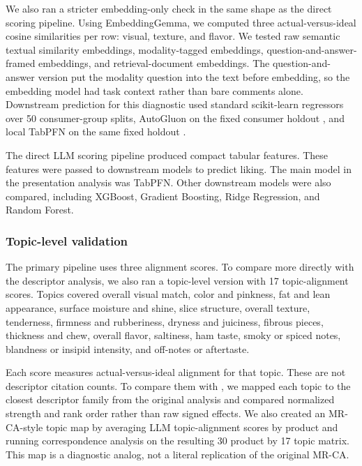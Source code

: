 \documentclass[12pt]{article}
\begin{document}
We also ran a stricter embedding-only check in the same shape as the direct scoring pipeline. Using EmbeddingGemma, we computed three actual-versus-ideal cosine similarities per row: visual, texture, and flavor. We tested raw semantic textual similarity embeddings, modality-tagged embeddings, question-and-answer-framed embeddings, and retrieval-document embeddings. The question-and-answer version put the modality question into the text before embedding, so the embedding model had task context rather than bare comments alone. Downstream prediction for this diagnostic used standard scikit-learn regressors over 50 consumer-group splits, AutoGluon on the fixed consumer holdout \citep{erickson2020autogluon}, and local TabPFN on the same fixed holdout \citep{hollmann2025tabpfn}.

The direct LLM scoring pipeline produced compact tabular features. These features were passed to downstream models to predict liking. The main model in the presentation analysis was TabPFN. Other downstream models were also compared, including XGBoost, Gradient Boosting, Ridge Regression, and Random Forest.

\subsubsection{Topic-level validation}

The primary pipeline uses three alignment scores. To compare more directly with the \citet{mahieu2022ifc} descriptor analysis, we also ran a topic-level version with 17 topic-alignment scores. Topics covered overall visual match, color and pinkness, fat and lean appearance, surface moisture and shine, slice structure, overall texture, tenderness, firmness and rubberiness, dryness and juiciness, fibrous pieces, thickness and chew, overall flavor, saltiness, ham taste, smoky or spiced notes, blandness or insipid intensity, and off-notes or aftertaste.

Each score measures actual-versus-ideal alignment for that topic. These are not descriptor citation counts. To compare them with \citet{mahieu2022ifc}, we mapped each topic to the closest descriptor family from the original analysis and compared normalized strength and rank order rather than raw signed effects. We also created an MR-CA-style topic map by averaging LLM topic-alignment scores by product and running correspondence analysis on the resulting 30 product by 17 topic matrix. This map is a diagnostic analog, not a literal replication of the original MR-CA.
\end{document}
